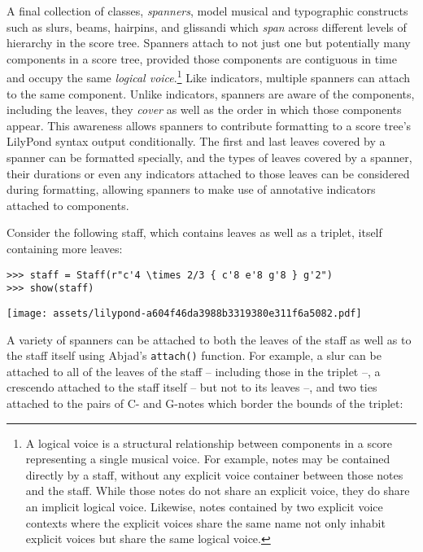 A final collection of classes, \emph{spanners}, model musical and typographic
constructs such as slurs, beams, hairpins, and glissandi which \emph{span}
across different levels of hierarchy in the score tree. Spanners attach to not
just one but potentially many components in a score tree, provided those
components are contiguous in time and occupy the same \emph{logical
voice}.\footnote{A logical voice is a structural relationship between
components in a score representing a single musical voice. For example, notes
may be contained directly by a staff, without any explicit voice container
between those notes and the staff. While those notes do not share an explicit
voice, they do share an implicit logical voice. Likewise, notes contained by
two explicit voice contexts where the explicit voices share the same name not
only inhabit explicit voices but share the same logical voice. } Like
indicators, multiple spanners can attach to the same component. Unlike
indicators, spanners are aware of the components, including the leaves, they
\emph{cover} as well as the order in which those components appear. This
awareness allows spanners to contribute formatting to a score tree's LilyPond
syntax output conditionally. The first and last leaves covered by a spanner can
be formatted specially, and the types of leaves covered by a spanner, their
durations or even any indicators attached to those leaves can be considered
during formatting, allowing spanners to make use of annotative indicators
attached to components.

Consider the following staff, which contains leaves as well as a triplet,
itself containing more leaves:

\begin{comment}
<abjad>
staff = Staff(r"c'4 \times 2/3 { c'8 e'8 g'8 } g'2")
show(staff)
</abjad>
\end{comment}

\begin{abjadbookoutput}
\begin{singlespacing}
\vspace{-0.5\baselineskip}
\begin{verbatim}
>>> staff = Staff(r"c'4 \times 2/3 { c'8 e'8 g'8 } g'2")
>>> show(staff)
\end{verbatim}
\noindent\texttt{[image: assets/lilypond-a604f46da3988b3319380e311f6a5082.pdf]}
\end{singlespacing}
\end{abjadbookoutput}

\noindent A variety of spanners can be attached to both the leaves of the staff
as well as to the staff itself using Abjad's \texttt{attach()} function. For
example, a slur can be attached to all of the leaves of the staff -- including
those in the triplet --, a crescendo attached to the staff itself -- but not to
its leaves --, and two ties attached to the pairs of C- and G-notes which
border the bounds of the triplet:

